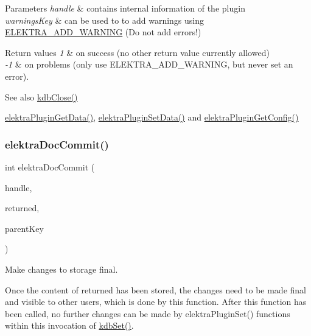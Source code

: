 \begin{DoxyParams}{Parameters}
{\em handle} & contains internal information of the plugin \\
\hline
{\em warnings\+Key} & can be used to to add warnings using \hyperlink{group__plugin_ga3da3bdb0f41710adda9eee3d7adac9ff}{E\+L\+E\+K\+T\+R\+A\+\_\+\+A\+D\+D\+\_\+\+W\+A\+R\+N\+I\+NG} (Do not add errors!)\\
\hline
\end{DoxyParams}

\begin{DoxyRetVals}{Return values}
{\em 1} & on success (no other return value currently allowed)\\
\hline
{\em -\/1} & on problems (only use E\+L\+E\+K\+T\+R\+A\+\_\+\+A\+D\+D\+\_\+\+W\+A\+R\+N\+I\+NG, but never set an error).\\
\hline
\end{DoxyRetVals}
\begin{DoxySeeAlso}{See also}
\hyperlink{group__kdb_gadb54dc9fda17ee07deb9444df745c96f}{kdb\+Close()} 

\hyperlink{group__plugin_gaafcf3216b46292f222b8cc7828b4dd20}{elektra\+Plugin\+Get\+Data()}, \hyperlink{group__plugin_gaf4b941a52ff55d0ca2a9158d90208ef2}{elektra\+Plugin\+Set\+Data()} and \hyperlink{group__plugin_ga644bead796506c172817724051c977c9}{elektra\+Plugin\+Get\+Config()} 
\end{DoxySeeAlso}
\mbox{\label{group__plugin_ga52807469897b8acbada5bcc6b8c8ceab}} 
\subsubsection{\texorpdfstring{elektra\+Doc\+Commit()}{elektraDocCommit()}}
{\footnotesize\ttfamily int elektra\+Doc\+Commit (\begin{DoxyParamCaption}\item[{Plugin $\ast$}]{handle,  }\item[{Key\+Set $\ast$}]{returned,  }\item[{Key $\ast$}]{parent\+Key }\end{DoxyParamCaption})}



Make changes to storage final. 

Once the content of {\ttfamily returned} has been stored, the changes need to be made final and visible to other users, which is done by this function. After this function has been called, no further changes can be made by elektra\+Plugin\+Set() functions within this invocation of \hyperlink{group__kdb_ga11436b058408f83d303ca5e996832bcf}{kdb\+Set()}.


